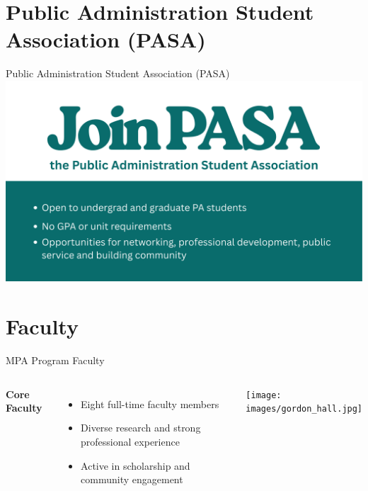 \documentclass[10pt]{beamer}
\begin{document}
\section{\textcolor{titanorange}{Public Administration Student Association (PASA)}}

\begin{frame}{Public Administration Student Association (PASA)}
  \centering
  \includegraphics[width=\textwidth]{images/join_PASA.png}
\end{frame}

\section{\textcolor{titanorange}{Faculty}}
\begin{frame}{MPA Program Faculty}
\begin{columns}[T,onlytextwidth]
  \textbf{Core Faculty}
  \begin{itemize}
    \item Eight full-time faculty members
    \item Diverse research and strong professional experience
    \item Active in scholarship and community engagement
  \end{itemize}
  \texttt{[image: images/gordon\_hall.jpg]}
\end{columns}
\end{frame}
\end{document}
